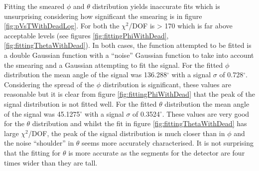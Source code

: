 Fitting the smeared $\phi$ and $\theta$ distribution yields inaccurate fits which is unsurprising considering how significant the smearing is in figure \ref{fig:pVsTWithDeadLog}. For both the $\chi^2$/DOF is > 170 which is far above acceptable levels (see figures \ref{fig:fittingPhiWithDead}, \ref{fig:fittingThetaWithDead}). In both cases, the function attempted to be fitted is a double Gaussian function with a ``noise'' Gaussian function to take into account the smearing and a Gaussian attempting to fit the signal. For the fitted $\phi$ distribution the mean angle of the signal was 136.288$^\circ$ with a signal $\sigma$ of 0.728$^\circ$. Considering the spread of the $\phi$ distribution is significant, these values are reasonable but it is clear from figure \ref{fig:fittingPhiWithDead} that the peak of the signal distribution is not fitted well. For the fitted $\theta$ distribution the mean angle of the signal was 45.1275$^\circ$ with a signal $\sigma$ of 0.3524$^\circ$. These values are very good for the $\theta$ distribution and whilst the fit in figure \ref{fig:fittingThetaWithDead} has large $\chi^2$/DOF, the peak of the signal distribution is much closer than in $\phi$ and the noise ``shoulder'' in $\theta$ seems more accurately characterised. It is not surprising that the fitting for $\theta$ is more accurate as the segments for the detector are four times wider than they are tall. 


